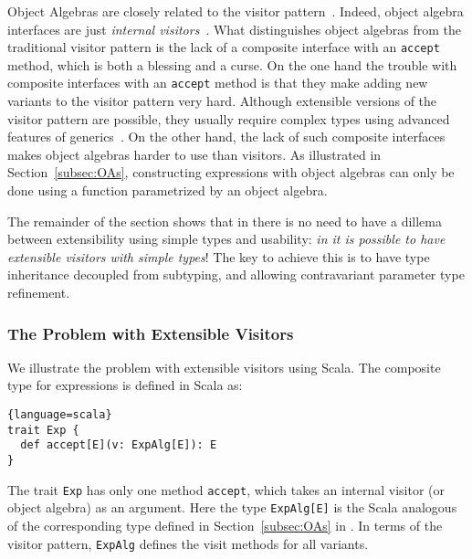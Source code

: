 Object Algebras are closely related to the visitor
pattern~\cite{gamma1994design}.  Indeed, object algebra interfaces are just
\emph{internal
  visitors}~\cite{oliveira09modular,oliveira2012extensibility}. 
What distinguishes object algebras
from the traditional visitor pattern is the lack of a composite
interface with an \lstinline{accept} method, which 
is both a blessing and a curse.  On
the one hand the trouble with composite interfaces with an
\lstinline{accept} method is that they make adding new variants to the
visitor pattern very hard. Although extensible versions of the visitor
pattern are possible, they usually require complex types using
advanced features of generics~\cite{togersen:2004,oliveira2012extensibility}. On the other hand, the lack of
such composite interfaces makes object algebras harder to use than
visitors. As illustrated in Section~\ref{subsec:OAs}, constructing expressions
with object algebras can only be done using a function parametrized by
an object algebra.

The remainder of the section shows that in \name there is no need to
have a dillema between extensibility using simple types and
usability: \emph{in \name it is possible to have extensible visitors with
simple types}! The key to achieve this is to have type inheritance
decoupled from subtyping, and allowing contravariant parameter type 
refinement. 

\subsubsection{The Problem with Extensible Visitors}
\begin{comment}
is another design pattern that
facilitates extensibility. The gist of this pattern is to decouple an object
hierarchy from the behaviors of each object. In other words, objects no longer
contain operations but instead ``accept'' visitors to perform operations on
them. The visitor pattern tackles at the very problem that makes programming in
traditional OO styles hard to add a new operation, since operations are defined
inside object classes that represent data structures. As a result, using the
visitor pattern allows adding new operations to existing structures without
modifying code of structures, a style enjoyed by functional
programming. 
\end{comment}
We illustrate the problem with extensible visitors using Scala.
The composite type for expressions is defined in Scala as:
\begin{lstlisting}{language=scala}
trait Exp {
  def accept[E](v: ExpAlg[E]): E
}
\end{lstlisting}
The trait \lstinline{Exp} has only one method 
\lstinline$accept$, which takes an internal visitor (or object
algebra) as an argument. 
Here the type \lstinline{ExpAlg[E]} is the Scala analogous of the
corresponding type defined in Section~\ref{subsec:OAs} in \name. In terms 
of the visitor pattern, \lstinline{ExpAlg} defines the visit methods 
for all variants. 

